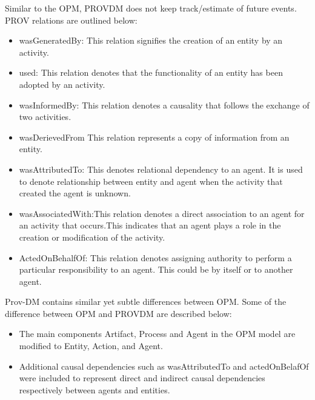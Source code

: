 Similar to the OPM, PROV\-DM does not keep track/estimate of future events. PROV relations are outlined below:


\begin{itemize}
\item wasGeneratedBy: This relation signifies the creation of an entity by an activity. 

\item used: This relation denotes that the functionality of an entity has been adopted by an activity.

\item wasInformedBy: This relation denotes a causality that follows the exchange of two activities.

\item wasDerievedFrom This relation represents a copy of information from an entity. 

\item wasAttributedTo: This denotes relational dependency to an agent. It is used to denote relationship between entity and agent when the activity that created the agent is unknown.

\item wasAssociatedWith:This relation denotes a direct association to an agent for an activity that occurs.This indicates that an agent plays a role in the creation or modification of the activity.

\item ActedOnBehalfOf: This relation denotes assigning authority to perform a particular responsibility to an agent. This could be by itself or to another agent.



\end{itemize}

Prov-DM contains similar yet subtle differences between OPM. Some of the difference between OPM and PROV\-DM are described below:

\begin{itemize}

\item The main components Artifact, Process and Agent in the OPM model are modified to Entity, Action, and Agent. 

\item Additional causal dependencies such as wasAttributedTo and actedOnBelafOf were included to represent direct and indirect causal dependencies respectively between agents and entities.

\end{itemize}

